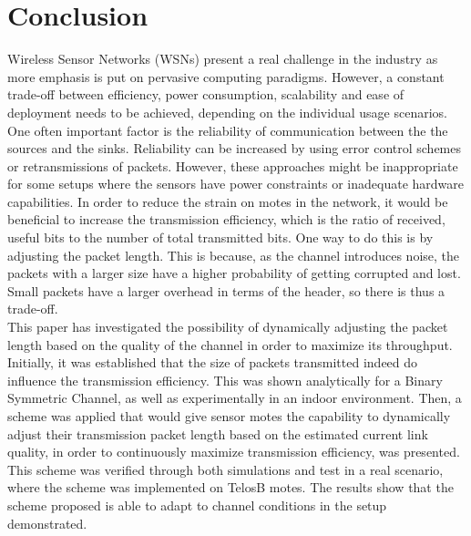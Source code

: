 \section{Conclusion\label{sec:conclusion}}
Wireless Sensor Networks (WSNs) present a real challenge in the industry as more emphasis is put on pervasive computing paradigms. However, a constant trade-off between efficiency, power consumption, scalability and ease of deployment needs to be achieved, depending on the individual usage scenarios. One often important factor is the reliability of communication between the the sources and the sinks. Reliability can be increased by using error control schemes or retransmissions of packets. However, these approaches might be inappropriate for some setups where the sensors have power constraints or inadequate hardware capabilities. 
In order to reduce the strain on motes in the network, it would be beneficial to increase the transmission efficiency, which is the ratio of received, useful bits to the number of total transmitted bits. One way to do this is by adjusting the packet length. This is because, as the channel introduces noise, the packets with a larger size have a higher probability of getting corrupted and lost. Small packets have a larger overhead in terms of the header, so there is thus a trade-off.
\\[8pt]
This paper has investigated the possibility of dynamically adjusting the packet length based on the quality of the channel in order to maximize its throughput. Initially, it was established that the size of packets transmitted indeed do influence the transmission efficiency. This was shown analytically for a Binary Symmetric Channel, as well as experimentally in an indoor environment. Then, a scheme was applied that would give sensor motes the capability to dynamically adjust their transmission packet length based on the estimated current link quality, in order to continuously maximize transmission efficiency, was presented. This scheme was verified through both simulations and test in a real scenario, where the scheme was implemented on TelosB motes. The results show that the scheme proposed is able to adapt to channel conditions in the setup demonstrated. 
